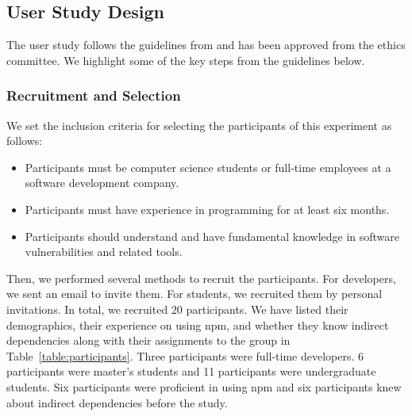 \documentclass[conference]{IEEEtran}
\begin{document}
	\subsection{User Study Design}
	The user study follows the guidelines from \citet{Ko2013} and has been approved from the ethics committee. We highlight some of the key steps from the guidelines below.
	
	\subsubsection{Recruitment and Selection}
	We set the inclusion criteria for selecting the participants of this experiment as follows:
	
	\begin{itemize}
		\item Participants must be computer science students or full-time employees at a software development company.
		\item Participants must have experience in programming for at least six months.
		\item Participants should understand and have fundamental knowledge in software vulnerabilities and related tools.
	\end{itemize}
	
	Then, we performed several methods to recruit the participants. For developers, we sent an email to invite them. For students, we recruited them by personal invitations. In total, we recruited 20 participants. We have listed their demographics, their experience on using npm, and whether they know indirect dependencies along with their assignments to the group in Table~\ref{table:participants}. Three participants were full-time developers. 6 participants were master's students and 11 participants were undergraduate students. Six participants were proficient in using npm and six participants knew about indirect dependencies before the study.
	
\end{document}
